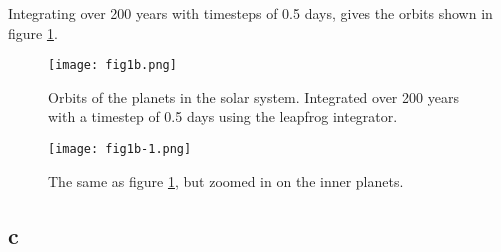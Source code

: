 Integrating over 200 years with timesteps of 0.5 days, gives the orbits shown in figure \ref{fig:orbits}.
\begin{figure}
    \centering
    \texttt{[image: fig1b.png]}
    \caption{Orbits of the planets in the solar system. Integrated over 200 years with a timestep of 0.5 days using the leapfrog integrator.}
    \label{fig:orbits}
\end{figure}
\begin{figure}
    \centering
    \texttt{[image: fig1b-1.png]}
    \caption{The same as figure \ref{fig:orbits}, but zoomed in on the inner planets.}
    \label{fig:orbits-zoom}
\end{figure}



\subsection*{c}
